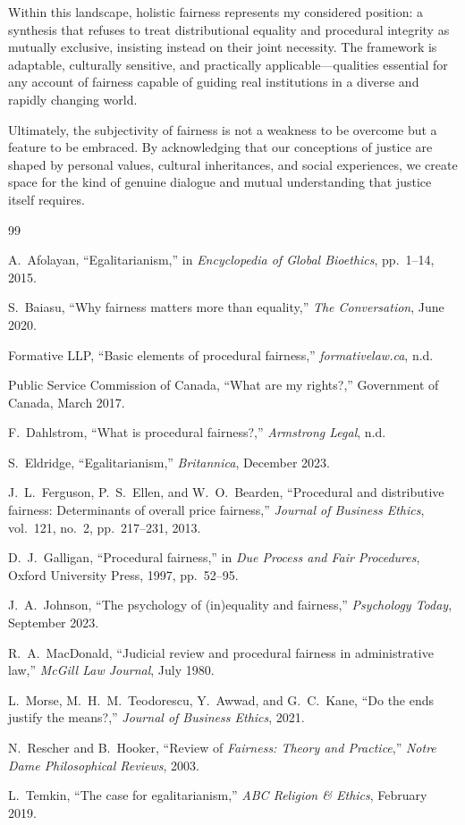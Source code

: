 \documentclass[11pt]{../shared/essay/essay}
\begin{document}
Within this landscape, holistic fairness represents my considered position: a synthesis that
refuses to treat distributional equality and procedural integrity as mutually exclusive, insisting
instead on their joint necessity. The framework is adaptable, culturally sensitive, and
practically applicable---qualities essential for any account of fairness capable of guiding real
institutions in a diverse and rapidly changing world.

Ultimately, the subjectivity of fairness is not a weakness to be overcome but a feature to be
embraced. By acknowledging that our conceptions of justice are shaped by personal values,
cultural inheritances, and social experiences, we create space for the kind of genuine dialogue
and mutual understanding that justice itself requires.

\begin{thebibliography}{99}

A.~Afolayan,
``Egalitarianism,''
in \textit{Encyclopedia of Global Bioethics}, pp.~1--14, 2015.

S.~Baiasu,
``Why fairness matters more than equality,''
\textit{The Conversation}, June 2020.

Formative LLP,
``Basic elements of procedural fairness,''
\textit{formativelaw.ca}, n.d.

Public Service Commission of Canada,
``What are my rights?,''
Government of Canada, March 2017.

F.~Dahlstrom,
``What is procedural fairness?,''
\textit{Armstrong Legal}, n.d.

S.~Eldridge,
``Egalitarianism,''
\textit{Britannica}, December 2023.

J.~L.~Ferguson, P.~S.~Ellen, and W.~O.~Bearden,
``Procedural and distributive fairness: Determinants of overall price fairness,''
\textit{Journal of Business Ethics}, vol.~121, no.~2, pp.~217--231, 2013.

D.~J.~Galligan,
``Procedural fairness,''
in \textit{Due Process and Fair Procedures},
Oxford University Press, 1997, pp.~52--95.

J.~A.~Johnson,
``The psychology of (in)equality and fairness,''
\textit{Psychology Today}, September 2023.

R.~A.~MacDonald,
``Judicial review and procedural fairness in administrative law,''
\textit{McGill Law Journal}, July 1980.

L.~Morse, M.~H.~M.~Teodorescu, Y.~Awwad, and G.~C.~Kane,
``Do the ends justify the means?,''
\textit{Journal of Business Ethics}, 2021.

N.~Rescher and B.~Hooker,
``Review of \textit{Fairness: Theory and Practice},''
\textit{Notre Dame Philosophical Reviews}, 2003.

L.~Temkin,
``The case for egalitarianism,''
\textit{ABC Religion \& Ethics}, February 2019.

\end{thebibliography}
\end{document}
